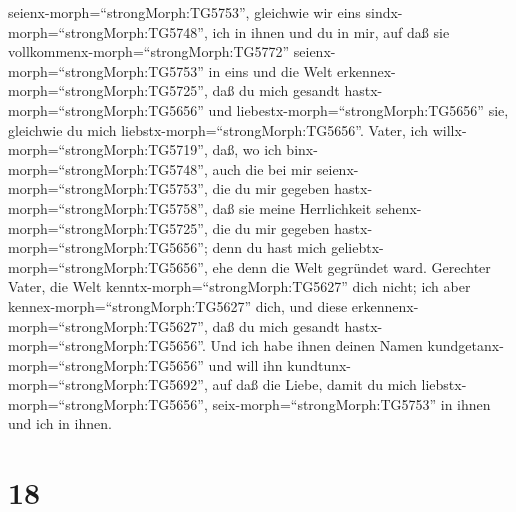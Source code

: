 seienx-morph=``strongMorph:TG5753'', gleichwie wir eins
sindx-morph=``strongMorph:TG5748'',  ich in ihnen und du in
mir, auf daß sie vollkommenx-morph=``strongMorph:TG5772''
seienx-morph=``strongMorph:TG5753'' in eins und die Welt
erkennex-morph=``strongMorph:TG5725'', daß du mich gesandt
hastx-morph=``strongMorph:TG5656'' und
liebestx-morph=``strongMorph:TG5656'' sie, gleichwie du mich
liebstx-morph=``strongMorph:TG5656''.  Vater, ich
willx-morph=``strongMorph:TG5719'', daß, wo ich
binx-morph=``strongMorph:TG5748'', auch die bei mir
seienx-morph=``strongMorph:TG5753'', die du mir gegeben
hastx-morph=``strongMorph:TG5758'', daß sie meine Herrlichkeit
sehenx-morph=``strongMorph:TG5725'', die du mir gegeben
hastx-morph=``strongMorph:TG5656''; denn du hast mich
geliebtx-morph=``strongMorph:TG5656'', ehe denn die Welt gegründet ward.
 Gerechter Vater, die Welt
kenntx-morph=``strongMorph:TG5627'' dich nicht; ich aber
kennex-morph=``strongMorph:TG5627'' dich, und diese
erkennenx-morph=``strongMorph:TG5627'', daß du mich gesandt
hastx-morph=``strongMorph:TG5656''.  Und ich habe ihnen
deinen Namen kundgetanx-morph=``strongMorph:TG5656'' und will ihn
kundtunx-morph=``strongMorph:TG5692'', auf daß die Liebe, damit du mich
liebstx-morph=``strongMorph:TG5656'', seix-morph=``strongMorph:TG5753''
in ihnen und ich in ihnen.

\hypertarget{section-17}{%
\section{18}\label{section-17}}

